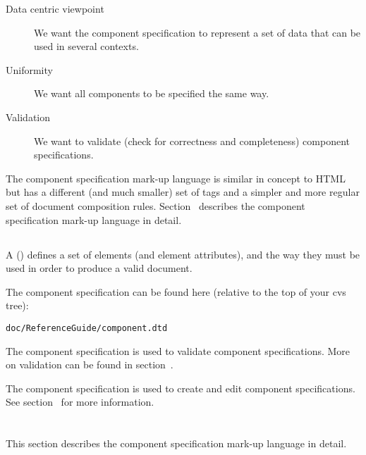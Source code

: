 \documentclass[11pt]{article}
\begin{document}
\begin{description}
\item[Data centric viewpoint] We want the component specification to
  represent a set of data that can be used in several contexts.

\item[Uniformity] We want all components to be specified the same way.
  
\item[Validation] We want to validate (check for correctness and
  completeness) component specifications.
\end{description}

The component specification mark-up language is similar in concept to HTML but
has a different (and much smaller) set of tags and a simpler and more
regular set of document composition rules.
Section~\sechyperref{\SECcontent} describes
the component specification mark-up language in detail.

\subsection{\SUBSECwhatDtd}
\label{\SUBSECwhatDtd}

A  (\dtd) defines a set of elements (and
element attributes), and the way they must be used in order to produce a
valid \xml{} document.

The component specification \dtd{} can be found here (relative to the top
of your cvs tree):

\begin{verbatim}
doc/ReferenceGuide/component.dtd
\end{verbatim}

The component specification \dtd{} is used to validate component
specifications.  More on validation can be found in
section~\sechyperref{\SECvalidation}.

The component specification \dtd{} is used to create and edit component
specifications.  See
section~\sechyperref{\SECediting} for more
information.

\section{\SECcontent}
\label{\SECcontent}

This section describes the component specification mark-up language in
detail.

\subsection{\SUBSECrules}
\label{\SUBSECrules}
\end{document}
